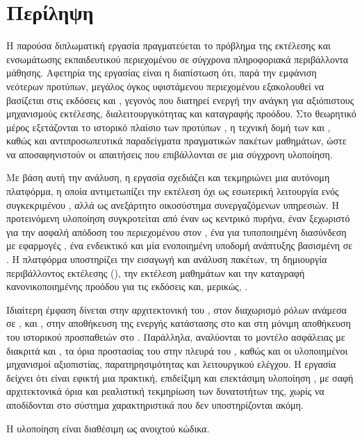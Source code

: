 \chapter*{Περίληψη}

Η παρούσα διπλωματική εργασία πραγματεύεται το πρόβλημα της εκτέλεσης και ενσωμάτωσης
εκπαιδευτικού περιεχομένου  σε σύγχρονα πληροφοριακά περιβάλλοντα μάθησης. Αφετηρία της
εργασίας είναι η διαπίστωση ότι, παρά την εμφάνιση νεότερων προτύπων, μεγάλος όγκος υφιστάμενου
περιεχομένου εξακολουθεί να βασίζεται στις εκδόσεις  και , γεγονός που
διατηρεί ενεργή την ανάγκη για αξιόπιστους μηχανισμούς εκτέλεσης, διαλειτουργικότητας και καταγραφής
προόδου. Στο θεωρητικό μέρος εξετάζονται το ιστορικό πλαίσιο των προτύπων , η τεχνική
δομή των  και , καθώς και αντιπροσωπευτικά παραδείγματα πραγματικών
πακέτων μαθημάτων, ώστε να αποσαφηνιστούν οι απαιτήσεις που επιβάλλονται σε μια σύγχρονη υλοποίηση.

Με βάση αυτή την ανάλυση, η εργασία σχεδιάζει και τεκμηριώνει μια αυτόνομη πλατφόρμα,
η οποία αντιμετωπίζει την εκτέλεση  όχι ως εσωτερική λειτουργία ενός
συγκεκριμένου , αλλά ως ανεξάρτητο οικοσύστημα συνεργαζόμενων υπηρεσιών. Η προτεινόμενη
υλοποίηση συγκροτείται από έναν  ως κεντρικό πυρήνα, έναν ξεχωριστό
 για την ασφαλή απόδοση του περιεχομένου στον , ένα  για
τυποποιημένη διασύνδεση με εφαρμογές , ένα ενδεικτικό  και μία ενοποιημένη
υποδομή ανάπτυξης βασισμένη σε . Η πλατφόρμα υποστηρίζει την εισαγωγή και ανάλυση πακέτων,
τη δημιουργία περιβάλλοντος εκτέλεσης (), την εκτέλεση μαθημάτων και την
καταγραφή κανονικοποιημένης προόδου για τις εκδόσεις  και, μερικώς, .

Ιδιαίτερη έμφαση δίνεται στην αρχιτεκτονική του , στον διαχωρισμό ρόλων ανάμεσα σε
,  και , στην αποθήκευση της ενεργής κατάστασης στο
 και στη μόνιμη αποθήκευση του ιστορικού προσπαθειών στο . Παράλληλα,
αναλύονται το μοντέλο ασφάλειας με διακριτά  και , τα όρια προστασίας
του  στην πλευρά του , καθώς και οι υλοποιημένοι μηχανισμοί αξιοπιστίας, παρατηρησιμότητας και
λειτουργικού ελέγχου. Η εργασία δείχνει ότι είναι εφικτή μια πρακτική, επιδείξιμη και επεκτάσιμη
υλοποίηση , με σαφή αρχιτεκτονικά όρια και ρεαλιστική τεκμηρίωση των δυνατοτήτων της, χωρίς
να αποδίδονται στο σύστημα χαρακτηριστικά που δεν υποστηρίζονται ακόμη.

Η υλοποίηση είναι διαθέσιμη ως ανοιχτού κώδικα.
